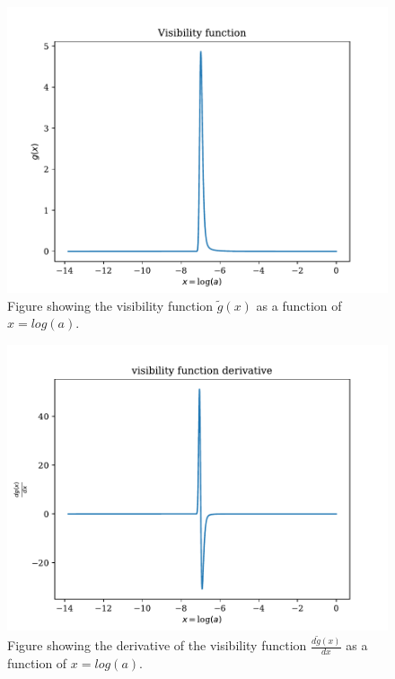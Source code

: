 \documentclass[onecolumn]{aastex62}
\begin{document}
\begin{figure}
    \includegraphics[scale=0.8]{figures/g.pdf}
    \caption{Figure showing the visibility function $\widetilde{g}(x)$ as a function of $x=log(a)$.}
    \label{fig:g}
\end{figure}

\begin{figure}
    \includegraphics[scale=0.8]{figures/dgdx.pdf}
    \caption{Figure showing the derivative of the visibility function $\frac{d\widetilde{g}(x)}{dx}$ as a function of $x=log(a)$.}
    \label{fig:dgdx}
\end{figure}
\end{document}
